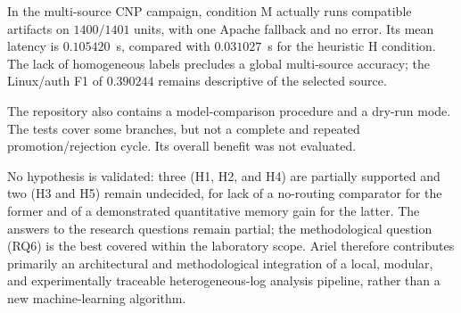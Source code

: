 In the multi-source CNP campaign, condition M actually runs compatible
artifacts on $1400/1401$ units, with one Apache fallback and no error. Its
mean latency is $0.105420$~s, compared with $0.031027$~s for the heuristic H
condition. The lack of homogeneous labels precludes a global multi-source
accuracy; the Linux/auth F1 of $0.390244$ remains descriptive of the selected
source.

The repository also contains a model-comparison procedure and a dry-run mode.
The tests cover some branches, but not a complete and repeated
promotion/rejection cycle. Its overall benefit was not evaluated.

No hypothesis is validated: three (H1, H2, and H4) are partially supported
and two (H3 and H5) remain undecided, for lack of a no-routing comparator for
the former and of a demonstrated quantitative memory gain for the latter. The
answers to the research questions remain partial; the methodological question
(RQ6) is the best covered within the laboratory scope. Ariel \logminer{}
therefore contributes primarily an architectural and methodological
integration of a local, modular, and experimentally traceable
heterogeneous-log analysis pipeline, rather than a new machine-learning
algorithm.
